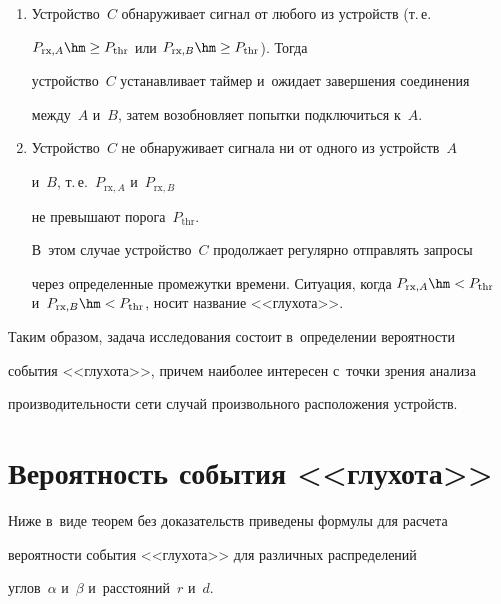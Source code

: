   \begin{enumerate}[1.]


\item Устройство~$C$ обнаруживает сигнал от любого из устройств (т.\,е.\ 


$P_{\mathrm{rx},A}\hm\geq P_{\mathrm{thr}}$ или $P_{\mathrm{rx},B}\hm\geq P_{\mathrm{thr}}$). Тогда 


устройство~$C$ устанавливает таймер и~ожидает завершения соединения 


между~$A$ и~$B$, затем возобновляет попытки подключиться к~$A$.


\item Устройство~$C$ не обнаруживает сигнала ни от одного из устройств~$A$ 


и~$B$, т.\,е.\  $P_{\mathrm{rx},A}$ и~$P_{\mathrm{rx},B}$ 


не превышают порога~$P_{\mathrm{thr}}$. 


В~этом случае устройство~$C$ продолжает регулярно отправлять запросы 


через определенные промежутки времени. Ситуация, когда $P_{\mathrm{rx},A}\hm< 


P_{\mathrm{thr}}$ и~$P_{\mathrm{rx},B}\hm< P_{\mathrm{thr}}$, носит название <<глухота>>.


\end{enumerate}





  Таким образом, задача исследования состоит в~определении вероятности 


события <<глухота>>, причем наиболее интересен с~точки зрения анализа 


производительности сети случай произвольного расположения устройств.


  


  \section{Вероятность события <<глухота>>}


  


  Ниже в~виде теорем без доказательств приведены формулы для расчета 


вероятности события <<глухота>> для различных распределений 


углов~$\alpha$ и~$\beta$ и~расстояний~$r$ и~$d$.


